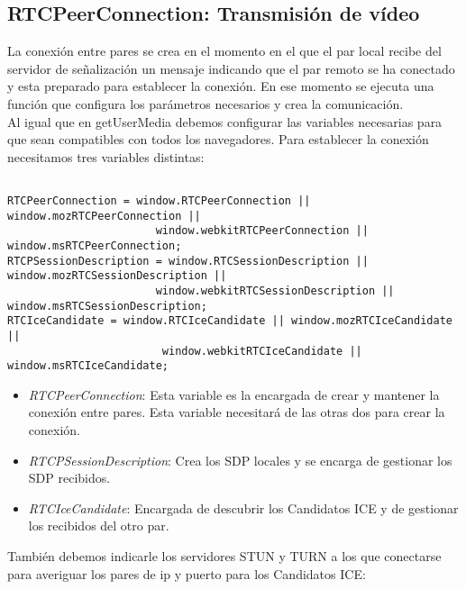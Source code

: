 \subsection{RTCPeerConnection: Transmisión de vídeo}

La conexión entre pares se crea en el momento en el que el par local recibe del servidor de señalización un mensaje indicando que el par remoto se ha conectado y esta preparado para establecer la conexión. En ese momento se ejecuta una función que configura los parámetros necesarios y  crea la comunicación.\\

Al igual que en getUserMedia debemos configurar las variables necesarias para que sean compatibles con todos los navegadores. Para establecer la conexión necesitamos tres variables distintas:\\


\begin{lstlisting}[caption=Variables WebRTC]

RTCPeerConnection = window.RTCPeerConnection || window.mozRTCPeerConnection || 
                       window.webkitRTCPeerConnection || window.msRTCPeerConnection;
RTCPSessionDescription = window.RTCSessionDescription || window.mozRTCSessionDescription ||
                       window.webkitRTCSessionDescription || window.msRTCSessionDescription;
RTCIceCandidate = window.RTCIceCandidate || window.mozRTCIceCandidate ||
                        window.webkitRTCIceCandidate || window.msRTCIceCandidate;

\end{lstlisting}

\begin{itemize}

\item \emph{RTCPeerConnection}: Esta variable es la encargada de crear y mantener la conexión entre pares. Esta variable necesitará de las otras dos para crear la conexión.
\item \emph{RTCPSessionDescription}: Crea los SDP locales y se encarga de gestionar los SDP recibidos.
\item \emph{RTCIceCandidate}: Encargada de descubrir los Candidatos ICE y de gestionar los recibidos del otro par.

\end{itemize}


También debemos indicarle los servidores STUN y TURN a los que conectarse para averiguar los pares de ip y puerto para los Candidatos ICE:\\

